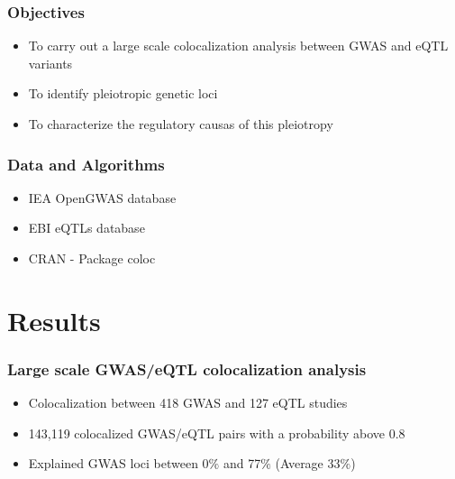 \documentclass{beamer}
\begin{document}
\begin{frame}
\frametitle{Objectives}

\begin{itemize}
\item To carry out a large scale colocalization analysis between GWAS and eQTL variants
\item To identify pleiotropic genetic loci
\item To characterize the regulatory causas of this pleiotropy
\end{itemize}
\end{frame}

\begin{frame}
\frametitle{Data and Algorithms}

\begin{itemize}
\item IEA OpenGWAS database
\item EBI eQTLs database
\item CRAN - Package coloc
\end{itemize}

\let\thefootnote\relax{}
\end{frame}


\section{Results}

\begin{frame}
\frametitle{Large scale GWAS/eQTL colocalization analysis}

\begin{itemize}
\item Colocalization between 418 GWAS and 127 eQTL studies
\item 143,119 colocalized GWAS/eQTL pairs with a probability above 0.8
\item Explained GWAS loci between 0$\%$ and 77$\%$ (Average 33$\%$)
\end{itemize}


\end{frame}
\end{document}
